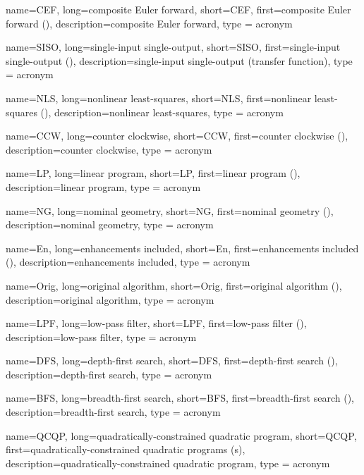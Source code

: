 {
	name={CEF},
	long={composite Euler forward},
	short={CEF},
	first={composite Euler forward ()},
	description={composite Euler forward},
	type = acronym
}

{
	name={SISO},
	long={single-input single-output},
	short={SISO},
	first={single-input single-output ()},
	description={single-input single-output (transfer function)},
	type = acronym
}

{
	name={NLS},
	long={nonlinear least-squares},
	short={NLS},
	first={nonlinear least-squares ()},
	description={nonlinear least-squares},
	type = acronym
}

{
	name={CCW},
	long={counter clockwise},
	short={CCW},
	first={counter clockwise  ()},
	description={counter clockwise},
	type = acronym
}

{
	name={LP},
	long={linear program},
	short={LP},
	first={linear program ()},
	description={linear program},
	type = acronym
}

{
	name={NG},
	long={nominal geometry},
	short={NG},
	first={nominal geometry ()},
	description={nominal geometry},
	type = acronym
}

{
	name={En},
	long={enhancements included},
	short={En},
	first={enhancements included ()},
	description={enhancements included},
	type = acronym
}

{
	name={Orig},
	long={original algorithm},
	short={Orig},
	first={original algorithm ()},
	description={original algorithm},
	type = acronym
}

{
	name={LPF},
	long={low-pass filter},
	short={LPF},
	first={low-pass filter ()},
	description={low-pass filter},
	type = acronym
}

{
	name={DFS},
	long={depth-first search},
	short={DFS},
	first={depth-first search ()},
	description={depth-first search},
	type = acronym
}

{
	name={BFS},
	long={breadth-first search},
	short={BFS},
	first={breadth-first search ()},
	description={breadth-first search},
	type = acronym
}

{
	name={QCQP},
	long={quadratically-constrained quadratic program},
	short={QCQP},
	first={quadratically-constrained quadratic programs (s)},
	description={quadratically-constrained quadratic program},
	type = acronym
}